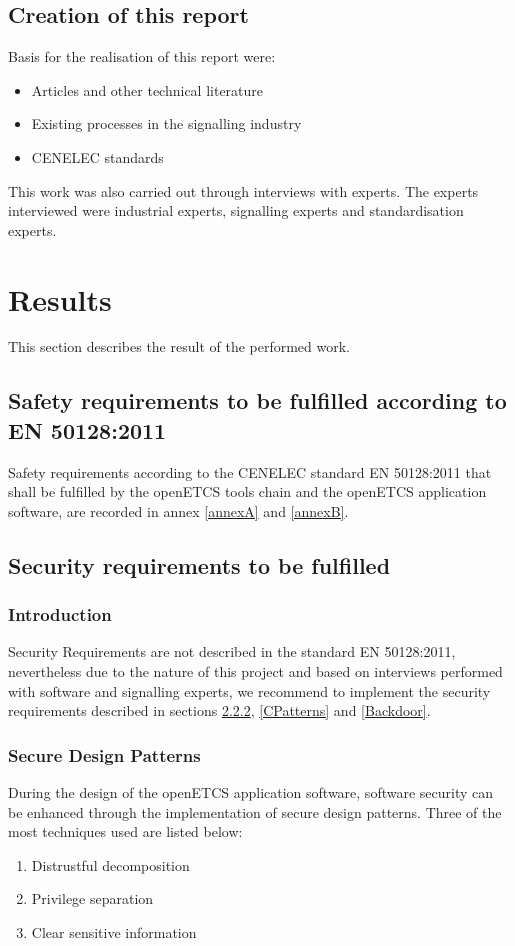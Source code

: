 \documentclass{template/openetcs_report}
\begin{document}
\section{Creation of this report}
\label{report}
Basis for the realisation of this report were:
\begin{itemize}
  \item Articles and other technical literature
  \item Existing processes in the signalling industry
  \item CENELEC standards
\end{itemize}

This work was also carried out through interviews with experts. The experts interviewed were industrial experts, signalling experts and standardisation experts. 


\chapter{Results}

This section describes the result of the performed work.

\section{Safety requirements to be fulfilled according to EN 50128:2011}

Safety requirements according to the CENELEC standard EN 50128:2011 that shall be fulfilled by the openETCS tools chain and the openETCS application software, are recorded in annex \ref{annexA} and \ref{annexB}.


\section{Security requirements to be fulfilled}
\subsection{Introduction}
Security Requirements are not described in the standard EN 50128:2011, nevertheless due to the nature of this project and based on interviews performed with software and signalling experts, we recommend to implement the security requirements described in sections \ref{DPatterns}, \ref{CPatterns} and \ref{Backdoor}.

\subsection{Secure Design Patterns}
\label{DPatterns}
During the design of the openETCS application software, software security can be enhanced through the implementation of secure design patterns. 
Three of the most techniques used are listed below:
\begin{enumerate}
  \item Distrustful decomposition
  \item Privilege separation
  \item Clear sensitive information
\end{enumerate}
\end{document}
